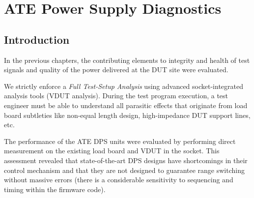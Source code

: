 
\chapter{\acs{ATE} Power Supply Diagnostics}
\label{ch:diagnostics}



\section{Introduction}
\label{sec:ch-diagnostics-introduction}

In the previous chapters, the contributing elements to integrity
and health of test signals and quality of the power delivered at the \ac{DUT}
site were evaluated.

We strictly enforce a \emph{Full Test-Setup Analysis} using advanced
socket-integrated analysis tools (\ac{VDUT} analysis).
During the test program execution, a test engineer must be able to
understand all parasitic effects that originate from load board subtleties
like non-equal length design, high-impedance \ac{DUT} support lines, etc.

The performance of the \acs{ATE} \acs{DPS} units were evaluated by performing
direct measurement on the existing load board and \ac{VDUT} in the socket.
This assessment revealed that state-of-the-art \ac{DPS} designs have
shortcomings in their control mechanism and that they are not designed to
guarantee range switching without massive errors (there is a considerable
sensitivity to sequencing and timing within the firmware code).







